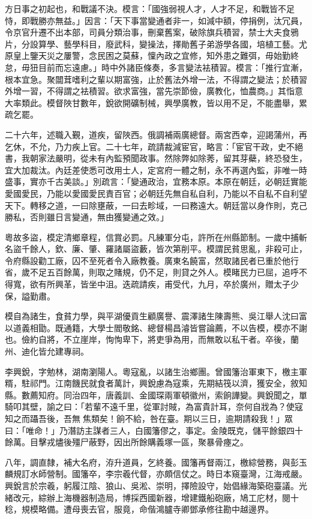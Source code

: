 \begin{pinyinscope}
方日事之初起也，和戰議不決。模言：「國強弱視人才，人才不足，和戰皆不足恃，即戰勝亦無益。」因言：「天下事當變通者非一，如減中額，停捐例，汰冗員，令京官升遷不出本部，司員分類治事，刪棄舊案，破除旗兵積習，禁士大夫食鴉片，分設算學、藝學科目，廢武科，變操法，擇勛舊子弟游學各國，培植工藝。尤原皇上鑒天災之屢警，念民困之莫蘇，懍內政之宜修，知外患之難弭，毋始勤終怠，毋狃目前而忘遠慮。」時中外諸臣條奏，多言變法袪積習。模言：「推行宜漸，根本宜急。聚闒茸嗜利之輩以期富強，止於舊法外增一法，不得謂之變法；於積習外增一習，不得謂之袪積習。欲求富強，當先崇節儉，廣教化，恤農商。」其恉意大率類此。模督陜甘數年，銳欲開礦制械，興學廣教，皆以用不足，不能盡舉，累疏乞罷。

二十六年，述職入覲，道疾，留陜西。俄調補兩廣總督。兩宮西幸，迎謁蒲州，再乞休，不允，乃力疾上官。二十七年，疏請裁減宦官，略言：「宦官干政，史不絕書，我朝家法嚴明，從未有內監預聞政事。然除弊如除莠，留其芽蘗，終恐發生，宜大加裁汰。內廷差使悉可改用士人，定宮府一體之制，永不再選內監，非唯一時盛事，實亦千古美談。」別疏言：「變通政治，宜務本原。本原在朝廷，必朝廷實能愛國愛民，乃能以愛國愛民責百官；必朝廷先無自私自利，乃能以不自私不自利望天下。轉移之道，一曰除壅蔽，一曰去畛域，一曰務遠大。朝廷當以身作則，克己勝私，否則雖日言變通，無由獲變通之效。」

粵故多盜，模定清鄉章程，信賞必罰。凡練軍分屯，許所在州縣節制。一歲中捕斬名盜千餘人，欽、廉、肇、羅諸屬盜藪，皆次第削平。模謂民貧思亂，非殺可止，令府縣設勸工廠，囚不至死者令入廠教養。廣東名饒富，然取諸民者已重於他行省，歲不足五百餘萬，則取之賭規，仍不足，則貸之外人。模睹民力已屈，追呼不得寬，欲有所興革，皆坐中沮。迭疏請疾，甫受代，九月，卒於廣州，贈太子少保，謚勤肅。

模自為諸生，食貧力學，與平湖優貢生顧廣譽、震澤諸生陳壽熊、吳江舉人沈曰富以道義相勖。既通籍，大學士閻敬銘、總督楊昌濬皆嘗論薦，不以告模，模亦不謝也。儉約自將，不立崖岸，恂恂卑下，將吏爭為用，而無敢以私干者。卒後，蘭州、迪化皆允建專祠。

李興銳，字勉林，湖南瀏陽人。粵寇亂，以諸生治鄉團。曾國籓治軍東下，檄主軍糈，駐祁門。江南饑民就食者萬計，興銳慮為寇乘，先期結筏以濟，獲安全，敘知縣。數薦知府。同治四年，唐義訓、金國琛兩軍頓徽州，索餉譁變。興銳聞之，單騎叩其壁，諭之曰：「若輩不遠千里，從軍討賊，為富貴計耳，奈何自戕為？使寇知之而躡吾後，吾無焦類矣！餉不給，咎在臺。期以三日，逾期請殺我！」眾曰：「唯命！」乃潛訪主謀者三人，白國籓僇之，事定。金陵既克，儲平餘銀四十餘萬。目擊戎燼後殭尸蔽野，因出所餘購義塚一區，聚暴骨瘞之。

八年，調直隸，補大名府，洊升道員，乞終養。國籓再督兩江，檄綜營務，與彭玉麟規訂水師營制。國籓卒，李宗羲代督，亦頗信仗之。時日本窺臺灣，江海戒嚴。興銳言於宗羲，躬履江陰、狼山、吳淞、崇明，擇險設守，始倡緣海築砲臺議。光緒改元，綜辦上海機器制造局，博採西國新器，增建鐵船砲廠，鳩工庀材，閱十稔，規模略備。遭母喪去官，服竟，命偕鴻臚寺卿鄧承修往勘中越邊界。


\end{pinyinscope}
